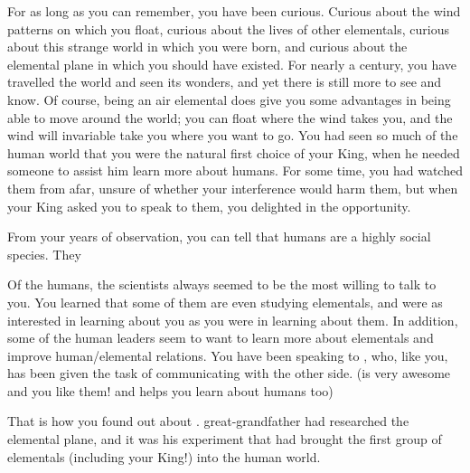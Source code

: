 \documentclass[char]{elementals}
\begin{document}
\name{\cNaturalist{}}

For as long as you can remember, you have been curious.  Curious about the wind patterns on which you float, curious about the lives of other elementals, curious about this strange world in which you were born, and curious about the elemental plane in which you should have existed.  For nearly a century, you have travelled the world and seen its wonders, and yet there is still more to see and know.  Of course, being an air elemental does give you some advantages in being able to move around the world; you can float where the wind takes you, and the wind will invariable take you where you want to go.  You had seen so much of the human world that you were the natural first choice of your King, \cKing{\intro} when he needed someone to assist him learn more about humans.  For some time, you had watched them from afar, unsure of whether your interference would harm them, but when your King asked you to speak to them, you delighted in the opportunity.

From your years of observation, you can tell that humans are a highly social species.  They 

Of the humans, the scientists always seemed to be the most willing to talk to you.  You learned that some of them are even studying elementals, and were as interested in learning about you as you were in learning about them.  In addition, some of the human leaders seem to want to learn more about elementals and improve human/elemental relations.  You have been speaking to , who, like you, has been given the task of communicating with the other side.   (is very awesome and you like them! and helps you learn about humans too)

That is how you found out about \cGD{\intro}.  \cGD{\Their} great-grandfather had researched the elemental plane, and it was his experiment that had brought the first group of elementals (including your King!) into the human world.  
\end{document}
